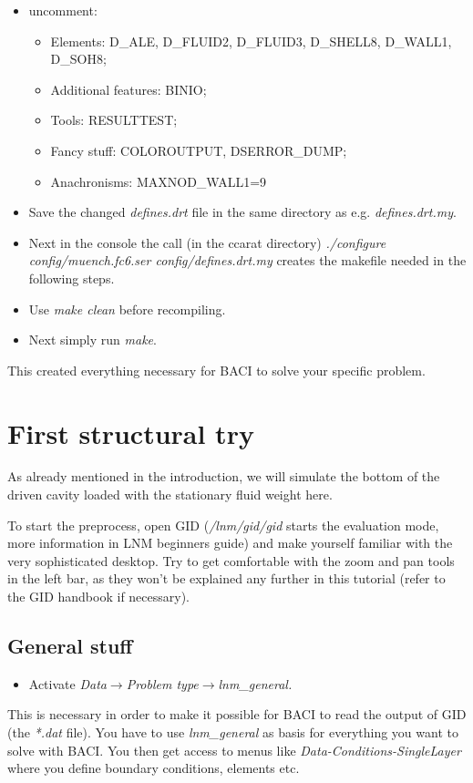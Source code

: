 \begin{itemize}
\item uncomment:

\begin{itemize}
\item Elements: D\_ALE, D\_FLUID2, D\_FLUID3, D\_SHELL8, D\_WALL1, D\_SOH8;
\item Additional features: BINIO;
\item Tools: RESULTTEST;
\item Fancy stuff: COLOROUTPUT, DSERROR\_DUMP;
\item Anachronisms: MAXNOD_WALL1=9
\end{itemize}
\item Save the changed \emph{defines.drt} file in the same directory as e.g.
\emph{defines.drt.my}. 
\item Next in the console the call (in the ccarat directory) \emph{./configure
config/muench.fc6.ser config/defines.drt.my} creates the makefile needed
in the following steps. 
\item Use \emph{make clean} before recompiling. 
\item Next simply run \emph{make}.
\end{itemize}
This created everything necessary for BACI to solve your specific
problem.


\section{First structural try}

As already mentioned in the introduction, we will simulate the bottom
of the driven cavity loaded with the stationary fluid weight here.

To start the preprocess, open GID (\emph{/lnm/gid/gid} starts the evaluation 
mode, more information in LNM beginners guide) and make yourself familiar with
the very sophisticated desktop. Try to get comfortable with the zoom
and pan tools in the left bar, as they won't be explained any further
in this tutorial (refer to the GID handbook if necessary).


\subsection{General stuff}

\begin{itemize}
\item Activate \emph{Data$\to$Problem type$\to$lnm\_general.}
\end{itemize}
This is necessary in order to make it possible for BACI to read the
output of GID (the \emph{{*}.dat} file). You have to use \emph{lnm\_general}
as basis for everything you want to solve with BACI. You then get
access to menus like \emph{Data-Conditions-SingleLayer} where you
define boundary conditions, elements etc.

